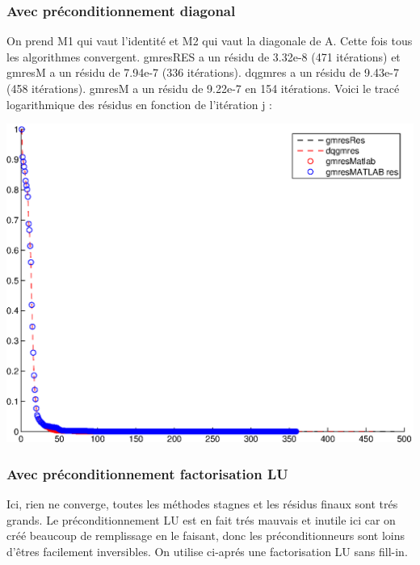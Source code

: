 \subsubsection*{Avec préconditionnement diagonal}
On prend M1 qui vaut l'identité et M2 qui vaut la diagonale de A. Cette fois tous les algorithmes convergent. gmresRES a un résidu de 3.32e-8 (471 itérations) et gmresM a un résidu de 7.94e-7 (336 itérations). dqgmres a un résidu de 9.43e-7 (458 itérations). gmresM a un résidu de 9.22e-7 en 154 itérations. Voici le tracé logarithmique des résidus en fonction de l'itération j :
\begin{center}
\includegraphics[scale=0.65]{diag.eps}
\end{center}
\newpage
\subsubsection*{Avec préconditionnement factorisation LU }
Ici, rien ne converge, toutes les méthodes stagnes et les résidus finaux sont trés grands. Le préconditionnement LU est en fait trés mauvais et inutile ici car on créé beaucoup de remplissage en le faisant, donc les préconditionneurs sont loins d'êtres facilement inversibles. On utilise ci-aprés une factorisation LU sans fill-in.
